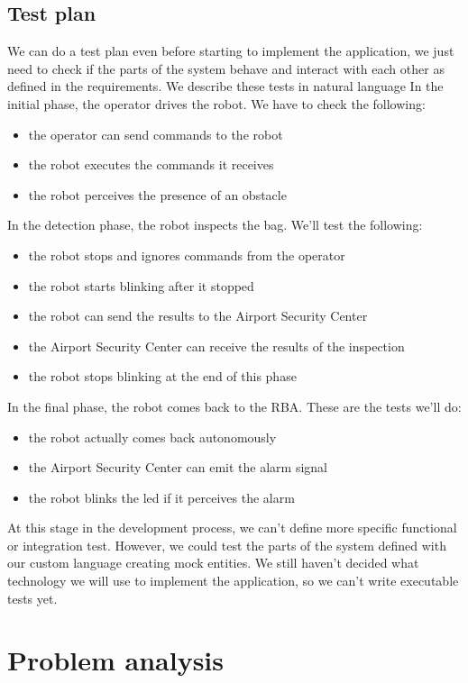 \documentclass{llncs}
\newcommand{\labelsec}[1]{\label{sec:#1}}
\begin{document}
\subsection{Test plan}
We can do a test plan even before starting to implement the application, we just need to check if the parts of the system behave and interact with each other as defined in the requirements.
We describe these tests in natural language
In the initial phase, the operator drives the robot. We have to check the following:
\begin{itemize}
\item the operator can send commands to the robot
\item the robot executes the commands it receives
\item the robot perceives the presence of an obstacle
\end{itemize}
In the detection phase, the robot inspects the bag. We'll test the following:
\begin{itemize}
\item the robot stops and ignores commands from the operator
\item the robot starts blinking after it stopped
\item the robot can send the results to the Airport Security Center
\item the Airport Security Center can receive the results of the inspection
\item the robot stops blinking at the end of this phase
\end{itemize}
In the final phase, the robot comes back to the RBA. These are the tests we'll do:
\begin{itemize}
\item the robot actually comes back autonomously
\item the Airport Security Center can emit the alarm signal
\item the robot blinks the led if it perceives the alarm
\end{itemize}
At this stage in the development process, we can't define more specific functional or integration test. However, we could test the parts of the system defined with our custom language creating mock entities.
We still haven't decided what technology we will use to implement the application, so we can't write executable tests yet.

\section{Problem analysis}
\labelsec{ProblemAnalysis}
\end{document}
